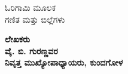 
\vfill 

\thispagestyle{empty}
\begin{center}
{\fontsize{30}{32}\selectfont ಓರಿಗಾಮಿ ಮೂಲಕ\\[0.2cm]
 ಗಣಿತ ಮತ್ತು ಬಿಲ್ಲೆಗಳು}
\vfill


{\Large\bfseries ಲೇಖಕರು}\\[4pt]
{\LARGE\bfseries ವೈ. ಬಿ. ಗುರಣ್ಣವರ }\\[4pt]
{\LARGE\bfseries ನಿವೃತ್ತ ಮುಖ್ಯೋಪಾಧ್ಯಾಯರು, ಕುಂದಗೋಳ}

\vfill




\end{center}
